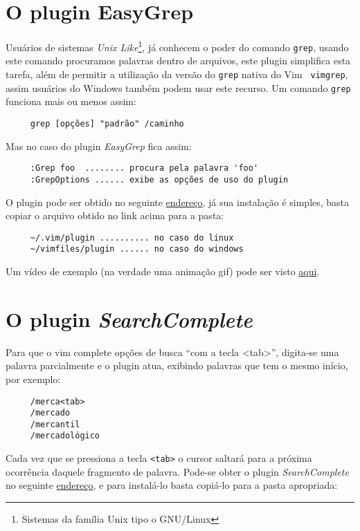 \section{O plugin EasyGrep}
\label{sec:O plugin EasyGrep}

Usuários de sistemas {\em Unix Like}\footnote{Sistemas da família Unix tipo o
GNU/Linux}, já conhecem o poder do comando {\tt grep}, usando este comando
procuramos palavras dentro de arquivos, este plugin simplifica esta tarefa,
além de permitir a utilização da versão do {\tt grep} nativa do Vim {\tt
vimgrep}, assim usuários do Windows também podem usar este recurso. Um comando
{\tt grep} funciona mais ou menos assim:

\begin{verbatim}
     grep [opções] "padrão" /caminho
\end{verbatim}

Mas no caso do plugin {\em EasyGrep} fica assim:

\begin{verbatim}
     :Grep foo  ........ procura pela palavra 'foo'
     :GrepOptions ...... exibe as opções de uso do plugin
\end{verbatim}

O plugin pode ser obtido no seguinte
\href{http://www.vim.org/scripts/script.php?script\_id=2438#0.9}{endereço}, já sua instalação
é simples, basta copiar o arquivo obtido no link acima para a pasta:
   
\begin{verbatim}
     ~/.vim/plugin .......... no caso do linux
     ~/vimfiles/plugin ...... no caso do windows
\end{verbatim}

Um vídeo de exemplo (na verdade uma animação gif) pode ser visto
\href{http://downloads.veryspeedy.net/vim/EasyGrep.gif}{aqui}.

\section{O plugin {\em SearchComplete}}
Para que o vim complete opções de busca ``com a tecla <tab>'', digita-se uma
palavra parcialmente e o plugin atua, exibindo palavras que tem 
o mesmo início, por exemplo:

\begin{verbatim}
     /merca<tab>
     /mercado
     /mercantil
     /mercadológico
\end{verbatim}

Cada vez que se pressiona a tecla {\tt <tab>} o cursor saltará para 
a próxima ocorrência daquele fragmento de palavra.
Pode-se obter o plugin {\em SearchComplete} no seguinte 
\href{http://www.vim.org/scripts/script.php?script\_id=474}{endereço}, 
e para instalá-lo basta copiá-lo para a pasta apropriada:
    
